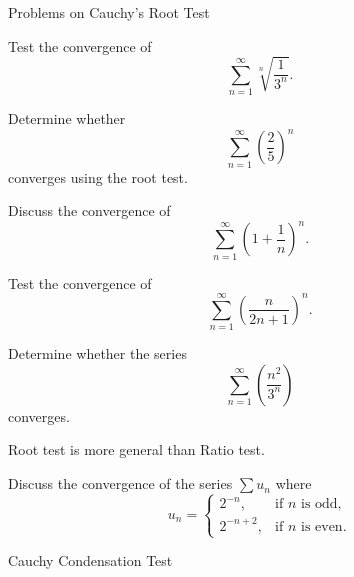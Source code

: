 \documentclass[12pt, a4paper]{article}
\begin{document}
\clearpage

\begin{heading}
    Problems on Cauchy's Root Test
\end{heading}

\begin{problem}
Test the convergence of 
\[
\sum_{n=1}^{\infty} \sqrt[n]{\frac{1}{3^n}}.
\]
\end{problem}

\clearpage

\begin{problem}
Determine whether 
\[
\sum_{n=1}^{\infty} \left( \frac{2}{5} \right)^n
\]
converges using the root test.
\end{problem}

\clearpage

\begin{problem}
Discuss the convergence of 
\[
\sum_{n=1}^{\infty} \left(1 + \frac{1}{n}\right)^n.
\]
\end{problem}

\clearpage

\begin{problem}
Test the convergence of 
\[
\sum_{n=1}^{\infty} \left(\frac{n}{2n+1}\right)^n.
\]
\end{problem}

\clearpage

\begin{problem}
Determine whether the series
\[
\sum_{n=1}^{\infty} \left(\frac{n^2}{3^n}\right)
\]
converges.
\end{problem}

\clearpage

\begin{heading}
	 Root test is more general than Ratio test.
\end{heading}

\vspace{10pt}

\begin{problem}
	Discuss the convergence of the series
	\( \sum u_n\) where
	\[ u_n =
	\begin{cases}
	2^{-n}, & \text{if } n \text{ is odd},\\[6pt]
	2^{-n+2}, & \text{if } n \text{ is even}.
	\end{cases}\]
\end{problem}

\clearpage

\begin{heading}
	Cauchy Condensation Test
\end{heading}
\end{document}
